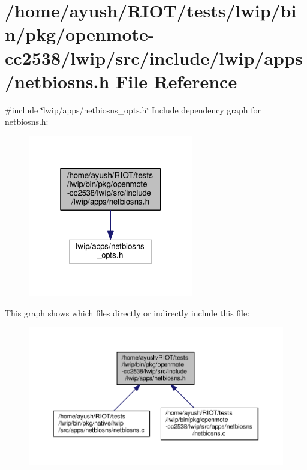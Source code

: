 \hypertarget{openmote-cc2538_2lwip_2src_2include_2lwip_2apps_2netbiosns_8h}{}\section{/home/ayush/\+R\+I\+O\+T/tests/lwip/bin/pkg/openmote-\/cc2538/lwip/src/include/lwip/apps/netbiosns.h File Reference}
\label{openmote-cc2538_2lwip_2src_2include_2lwip_2apps_2netbiosns_8h}
{\ttfamily \#include \char`\"{}lwip/apps/netbiosns\+\_\+opts.\+h\char`\"{}}\newline
Include dependency graph for netbiosns.\+h\+:
\nopagebreak
\begin{figure}[H]
\begin{center}
\leavevmode
\includegraphics[width=205pt]{openmote-cc2538_2lwip_2src_2include_2lwip_2apps_2netbiosns_8h__incl}
\end{center}
\end{figure}
This graph shows which files directly or indirectly include this file\+:
\nopagebreak
\begin{figure}[H]
\begin{center}
\leavevmode
\includegraphics[width=350pt]{openmote-cc2538_2lwip_2src_2include_2lwip_2apps_2netbiosns_8h__dep__incl}
\end{center}
\end{figure}

